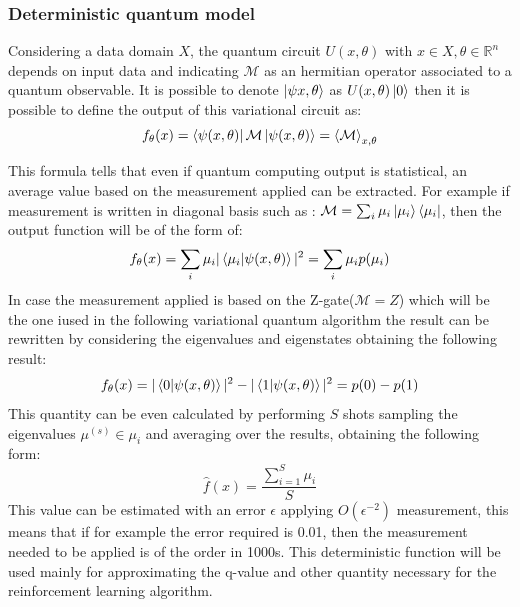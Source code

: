 \subsubsection{Deterministic quantum model}
\begin{mydef}
	Considering a data domain $X$, the quantum circuit $U(x, \theta)$ with $x \in X, \theta \in \mathbb{R}^n$ depends on input data and indicating $\mathcal{M}$ as an hermitian operator associated to a quantum observable. It is possible to denote $\ket{\psi{x,\theta}}$ as  $U(x,\theta)\ket{0}$ then it is possible to define the output of this variational circuit as:
	\begin{equation}\label{quantum deterministic}
		f_\theta(x) = \bra{\psi(x, \theta)} \mathcal{M}  \ket{\psi(x, \theta)} = \braket{\mathcal{M}}_{x,\theta}
	\end{equation}
\end{mydef}
This formula tells that even if quantum computing output is statistical, an average value based on the measurement applied can be extracted. For example if measurement is written in diagonal basis such as : $\mathcal{M} = \sum_i \mu_i \ket{\mu_i} \bra{\mu_i}$, then the output function will be of the form of:
\begin{equation*}
	f_\theta(x) = \sum_i \mu_i |\braket{\mu_i |\psi(x, \theta)}|^2 = \sum_i \mu_i p(\mu_i)
\end{equation*}
In case the measurement applied is based on the Z-gate($\mathcal{M} = Z$) which will be the one iused in the following variational quantum algorithm the result can be rewritten by considering the eigenvalues and eigenstates obtaining the following result:
\begin{equation*}
	f_\theta(x) = |\braket{0|\psi(x, \theta)}|^2 - |\braket{1| \psi(x, \theta)}|^2 = p(0) - p(1)
\end{equation*}
This quantity can be even calculated by performing $S$ shots sampling the eigenvalues $\mu^(s) \in {\mu_i}$ and averaging over the results, obtaining the following form:
\begin{equation*}
	\hat{f}(x) = \frac{\sum_{i=1}^{S}\mu_i}{S}
\end{equation*}
This value can be estimated with an error $\epsilon$ applying $O(\epsilon^{-2})$ measurement, this means that if for example the error required is 0.01, then the measurement needed to be applied is of the order in 1000s. This deterministic function will be used mainly for approximating the q-value and other quantity necessary for the reinforcement learning algorithm. 
